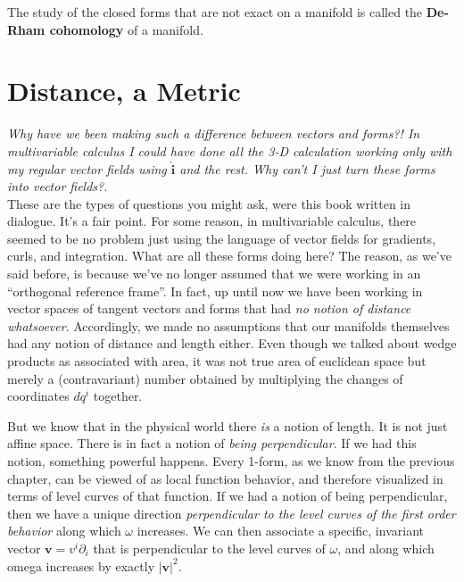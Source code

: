 \documentclass[../master.tex]{subfiles}
\begin{document}
	The study of the closed forms that are not exact on a manifold is called the \textbf{De-Rham cohomology} of a manifold. \\
	
	
	
	\section{Distance, a Metric}	
	
	
	\emph{Why have we been making such a difference between vectors and forms?! In multivariable calculus I could have done all the 3-D calculation working only with my regular vector fields using $\hat{\mathbf{i}}$ and the rest. Why can't I just turn these forms into vector fields?}.\\
	
	These are the types of questions you might ask, were this book written in dialogue. It's a fair point. For some reason, in multivariable calculus, there seemed to be no problem just using the language of vector fields for gradients, curls, and integration. What are all these forms doing here? The reason, as we've said before, is because we've no longer assumed that we were working in an ``orthogonal reference frame''. In fact, up until now we have been working in vector spaces of tangent vectors and forms that had \emph{no notion of distance whatsoever}. Accordingly, we made no assumptions that our manifolds themselves had any notion of distance and length either. Even though we talked about wedge products as associated with area, it was not true area of euclidean space but merely a (contravariant) number obtained by multiplying the changes of coordinates $dq^i$ together. 
	
	
	But we know that in the physical world there \emph{is} a notion of length. It is not just affine space. There is in fact a notion of \emph{being perpendicular}. If we had this notion, something powerful happens. Every 1-form, as we know from the previous chapter, can be viewed of as local function behavior, and therefore visualized in terms of level curves of that function. If we had a notion of being perpendicular, then we have a unique direction \emph{perpendicular to the level curves of the first order behavior} along which $\omega$ increases. We can then associate a specific, invariant vector $\mathbf v = v^i \partial_i$ that is perpendicular to the level curves of $\omega$, and along which omega increases by exactly $|\mathbf v|^2$. 
	
\end{document}
